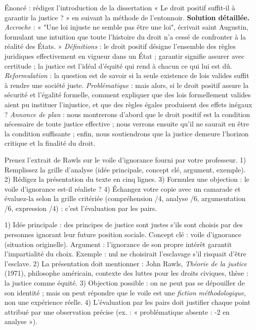 \documentclass[11pt]{article}
\begin{document}
\begin{exoresolu}
Énoncé : rédigez l'introduction de la dissertation « Le droit positif suffit-il à garantir la justice ? » en suivant la méthode de l'entonnoir.
\tcblower
\textbf{Solution détaillée.} \emph{Accroche} : « "Une loi injuste ne semble pas être une loi", écrivait saint Augustin, formulant une intuition que toute l'histoire du droit n'a cessé de confronter à la réalité des États. » \emph{Définitions} : le droit positif désigne l'ensemble des règles juridiques effectivement en vigueur dans un État ; garantir signifie assurer avec certitude ; la justice est l'idéal d'équité qui rend à chacun ce qui lui est dû. \emph{Reformulation} : la question est de savoir si la seule existence de lois valides suffit à rendre une société juste. \emph{Problématique} : mais alors, si le droit positif assure la sécurité et l'égalité formelle, comment expliquer que des lois formellement valides aient pu instituer l'injustice, et que des règles égales produisent des effets inégaux ? \emph{Annonce de plan} : nous montrerons d'abord que le droit positif est la condition nécessaire de toute justice effective ; nous verrons ensuite qu'il ne saurait en être la condition suffisante ; enfin, nous soutiendrons que la justice demeure l'horizon critique et la finalité du droit.
\end{exoresolu}

\begin{exercice}
Prenez l'extrait de Rawls sur le voile d'ignorance fourni par votre professeur. 1) Remplissez la grille d'analyse (idée principale, concept clé, argument, exemple). 2) Rédigez la présentation du texte en cinq lignes. 3) Formulez une objection : le voile d'ignorance est-il réaliste ? 4) Échangez votre copie avec un camarade et évaluez-la selon la grille critériée (compréhension /4, analyse /6, argumentation /6, expression /4) : c'est l'évaluation par les pairs.
\end{exercice}

\begin{corrige}
1) Idée principale : des principes de justice sont justes s'ils sont choisis par des personnes ignorant leur future position sociale. Concept clé : voile d'ignorance (situation originelle). Argument : l'ignorance de son propre intérêt garantit l'impartialité du choix. Exemple : nul ne choisirait l'esclavage s'il risquait d'être l'esclave. 2) La présentation doit mentionner : John Rawls, \emph{Théorie de la justice} (1971), philosophe américain, contexte des luttes pour les droits civiques, thèse : la justice comme équité. 3) Objection possible : on ne peut pas se dépouiller de son identité ; mais on peut répondre que le voile est une \emph{fiction méthodologique}, non une expérience réelle. 4) L'évaluation par les pairs doit justifier chaque point attribué par une observation précise (ex. : « problématique absente : -2 en analyse »).
\end{corrige}
\end{document}
